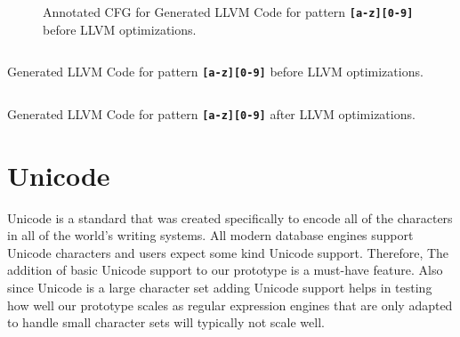 \begin{figure}[htbp]
    \caption{Annotated CFG for Generated LLVM Code for pattern \texttt{\textbf{[a-z][0-9]}} before LLVM optimizations.}
    \label{fig:annocfg}
\end{figure}


\begin{longlisting}
\inputminted[breaklines=true,frame=lines,linenos]{llvm}{code/irbefore.ll}
\caption{Generated LLVM Code for pattern \texttt{\textbf{[a-z][0-9]}} before LLVM optimizations.}
\label{lst:llvmex}
\end{longlisting}


\begin{listing}[H]
\inputminted[breaklines=true,frame=lines,linenos]{llvm}{code/irafter.ll}
\caption{Generated LLVM Code for pattern \texttt{\textbf{[a-z][0-9]}} after LLVM optimizations.}
\label{lst:llvmexs}
\end{listing}

\section{Unicode}
Unicode is a standard that was created specifically to encode all of the characters in all of the world's writing systems. All modern database engines support Unicode characters and users expect some kind Unicode support. Therefore, The addition of basic Unicode support to our prototype is a must-have feature. Also since Unicode is a large character set adding Unicode support helps in testing how well our prototype scales as regular expression engines that are only adapted to handle small character sets will typically not scale well.

